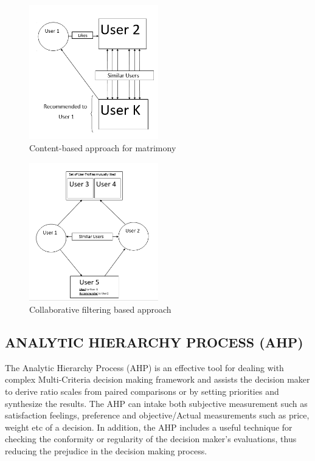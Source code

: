 \documentclass[12pt,oneside]{book}
\begin{document}
\begin{figure}[h]
    \centering
    \includegraphics[width=0.5\textwidth]{cb}
    \caption{Content-based approach for matrimony}
    \label{fig:cb}
\end{figure}
\begin{figure}[h!]
    \centering
    \includegraphics[width=0.5\textwidth]{cf}
    \caption{Collaborative filtering based approach}
    \label{fig:cf}
\end{figure}

\subsection{ANALYTIC HIERARCHY PROCESS (AHP)}
The Analytic Hierarchy Process (AHP) is an effective tool for dealing with complex Multi-Criteria decision making framework and assists the decision maker to derive ratio scales from paired comparisons or by setting priorities and synthesize the results. The  AHP can intake both subjective measurement such as satisfaction feelings, preference and objective/Actual measurements such as price, weight etc of a decision. In addition, the AHP includes a useful technique for checking the conformity or regularity of the decision maker's evaluations, thus reducing the prejudice in the decision making process.
\end{document}
